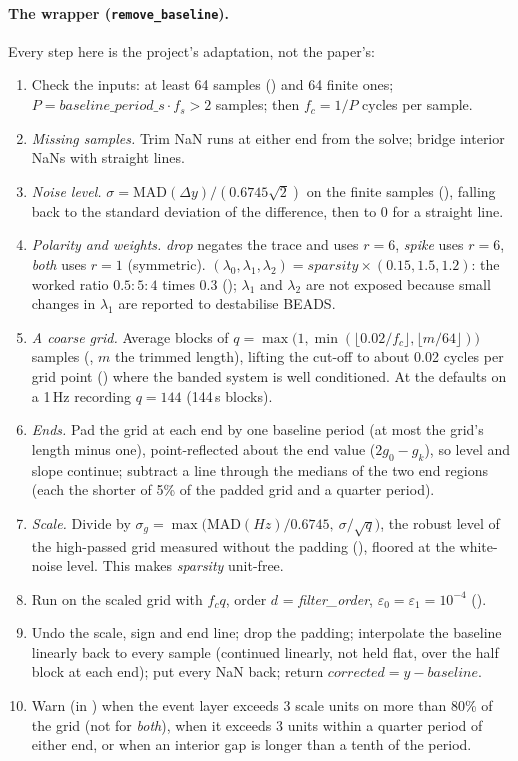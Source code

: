 \paragraph{The wrapper (\texttt{remove\_baseline}).} Every step here is the project's adaptation,
not the paper's:
\begin{enumerate}
\item Check the inputs: at least 64 samples () and 64 finite ones;
  $P = \mathit{baseline\_period\_s}\cdot f_s > 2$ samples; then $f_c = 1/P$ cycles per sample.
\item \emph{Missing samples.} Trim NaN runs at either end from the solve; bridge interior NaNs
  with straight lines.
\item \emph{Noise level.} $\sigma = \mathrm{MAD}(\Delta y)/(0.6745\sqrt2)$ on the finite samples
  (), falling back to the standard deviation of the difference, then to 0 for
  a straight line.
\item \emph{Polarity and weights.} \emph{drop} negates the trace and uses $r = 6$, \emph{spike}
  uses $r = 6$, \emph{both} uses $r = 1$ (symmetric). $(\lambda_0, \lambda_1, \lambda_2) =
  \mathit{sparsity}\times(0.15, 1.5, 1.2)$: the worked ratio $0.5 : 5 : 4$ times 0.3
  (); $\lambda_1$ and $\lambda_2$ are not exposed because small changes in
  $\lambda_1$ are reported to destabilise BEADS.
\item \emph{A coarse grid.} Average blocks of $q = \max\bigl(1, \min(\lfloor 0.02/f_c\rfloor,
  \lfloor m/64\rfloor)\bigr)$ samples (, $m$ the trimmed length), lifting the
  cut-off to about 0.02 cycles per grid point () where the banded system is well
  conditioned. At the defaults on a 1\,Hz recording $q = 144$ (144\,s blocks).
\item \emph{Ends.} Pad the grid at each end by one baseline period (at most the grid's length
  minus one), point-reflected about the end value ($2g_0 - g_k$), so level and slope continue;
  subtract a line through the medians of the two end regions (each the shorter of 5\% of the
  padded grid and a quarter period).
\item \emph{Scale.} Divide by $\sigma_g = \max\bigl(\mathrm{MAD}(Hz)/0.6745,\ \sigma/\sqrt q\bigr)$,
  the robust level of the high-passed grid measured without the padding (),
  floored at the white-noise level. This makes \emph{sparsity} unit-free.
\item Run  on the scaled grid with $f_c q$, order $d$ = \emph{filter\_order},
  $\varepsilon_0 = \varepsilon_1 = 10^{-4}$ ().
\item Undo the scale, sign and end line; drop the padding; interpolate the baseline linearly
  back to every sample (continued linearly, not held flat, over the half block at each end);
  put every NaN back; return $\mathit{corrected} = y - \mathit{baseline}$.
\item Warn (in ) when the event layer exceeds 3 scale units on more than
  80\% of the grid (not for \emph{both}), when it exceeds 3 units within a quarter period of
  either end, or when an interior gap is longer than a tenth of the period.
\end{enumerate}
